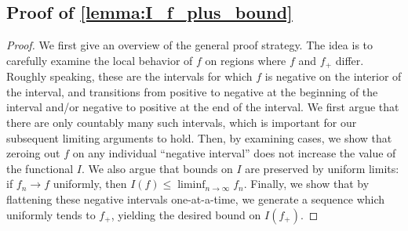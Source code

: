 \documentclass{article}
\begin{document}
\begin{appendices}
\subsection{Proof of \cref{lemma:I_f_plus_bound}} \label{appendix:proof_I_f_plus_bound}
\begin{proof}
    We first give an overview of the general proof strategy. The idea is to carefully examine the local behavior of $f$ on regions where $f$ and $f_+$ differ. Roughly speaking, these are the intervals for which $f$ is negative on the interior of the interval, and transitions from positive to negative at the beginning of the interval and/or negative to positive at the end of the interval. We first argue that there are only countably many such intervals, which is important for our subsequent limiting arguments to hold. Then, by examining cases, we show that zeroing out $f$ on any individual ``negative interval'' does not increase the value of the functional $I$. We also argue that bounds on $I$ are preserved by uniform limits: if $f_n \to f$ uniformly, then $I(f) \leq \liminf_{n \to \infty} f_n$. Finally, we show that by flattening these negative intervals one-at-a-time, we generate a sequence which uniformly tends to $f_+$, yielding the desired bound on $I(f_+)$. 
    

\end{proof}
\end{appendices}
\end{document}
